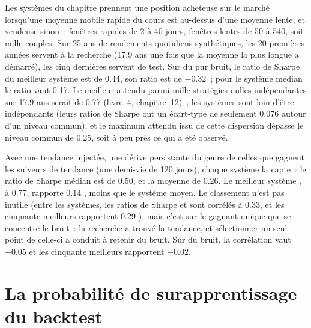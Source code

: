 Les systèmes du chapitre prennent une position acheteuse sur le marché lorsqu'une moyenne mobile rapide du cours est au-dessus d'une moyenne lente, et vendeuse sinon~: fenêtres rapides de 2 à 40
jours, fenêtres lentes de 50 à 540, soit mille couples. Sur 25 ans de rendements quotidiens synthétiques, les 20 premières années servent à la recherche (17.9 ans une fois que la
moyenne la plus longue a démarré), les cinq dernières servent de test. Sur du pur bruit, le ratio de Sharpe  du meilleur système est de 0.44, son ratio  est de $-0.32$~; pour le système médian
le ratio  vaut 0.17. Le meilleur attendu parmi mille stratégies nulles indépendantes sur 17.9 ans serait de 0.77 (livre~4, chapitre~12)~; les systèmes
sont loin d'être indépendants (leurs ratios de Sharpe ont un écart-type de seulement 0.076 autour d'un niveau commun), et le maximum attendu issu
de cette dispersion dépasse le niveau commun de 0.25, soit à peu près ce qui a été observé.

Avec une tendance injectée, une dérive persistante du genre de celles que gagnent les suiveurs de tendance (une demi-vie de 120 jours), chaque système la capte~: le ratio de Sharpe médian 
est de 0.50, et la moyenne  de 0.26. Le meilleur système , à 0.77, rapporte 0.14 , moins que le système moyen. Le classement n'est pas inutile (entre les systèmes, les ratios de Sharpe  et
 sont corrélés à 0.33, et les cinquante meilleurs  rapportent 0.29 ), mais c'est sur le gagnant unique que se concentre le bruit~: la
recherche a trouvé la tendance, et sélectionner un seul point de celle-ci a conduit à retenir du bruit. Sur du bruit, la corrélation vaut $-0.05$ et les cinquante meilleurs rapportent $-0.02$.

\section{La probabilité de surapprentissage du backtest}

